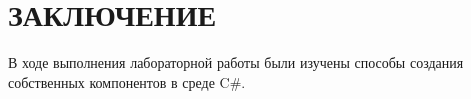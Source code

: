 \section*{ЗАКЛЮЧЕНИЕ}

В ходе выполнения лабораторной работы были изучены способы создания
собственных компонентов в среде C\#.

\newpage
